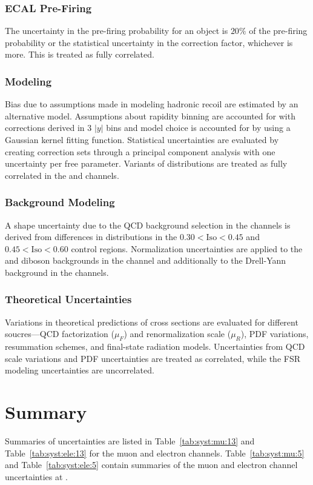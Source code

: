 \subsubsection{ECAL Pre-Firing}
The uncertainty in the pre-firing probability for an object is $20\%$ of the pre-firing probability or the statistical uncertainty in the correction factor, whichever is more. This is treated as fully correlated.

\subsubsection{\met Modeling}
Bias due to assumptions made in modeling hadronic recoil are estimated by an alternative model. Assumptions about rapidity binning are accounted for with corrections derived in 3 $|y|$ bins and model choice is accounted for by using a Gaussian kernel fitting function. Statistical uncertainties are evaluated by creating correction sets through a principal component analysis with one uncertainty per free parameter. Variants of \mt distributions are treated as fully correlated in the \Wp and \Wm channels.

\subsubsection{Background Modeling}
A shape uncertainty due to the QCD background selection in the \W channels is derived from differences in \mt distributions in the $0.30 < \mathrm{Iso} <  0.45$ and $0.45 < \mathrm{Iso} <  0.60$ control regions. Normalization uncertainties are applied to the \ttbar and diboson backgrounds in the \Z channel and additionally to the Drell-Yann background in the \W channels.

\subsubsection{Theoretical Uncertainties}
Variations in theoretical predictions of cross sections are evaluated for different soucres---QCD factorization ($\mu_F$) and renormalization scale ($\mu_R$), PDF variations, resummation schemes, and final-state radiation models. Uncertainties from QCD scale variations and PDF uncertainties are treated as correlated, while the FSR modeling uncertainties are uncorrelated.

\section{Summary}
Summaries of uncertainties are listed in Table~\ref{tab:syst:mu:13}  and Table~\ref{tab:syst:ele:13} for the \serah muon and electron channels. Table~\ref{tab:syst:mu:5} and Table~\ref{tab:syst:ele:5} contain summaries of the muon and electron channel uncertainties at \serag.







